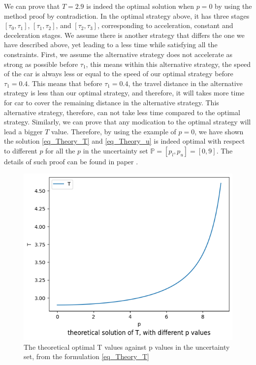 \documentclass  [
  paper    = a4,
  BCOR     = 10mm,
  twoside,
  fontsize = 12pt,
  fleqn,
  toc      = bibnumbered,
  toc      = listofnumbered,
  numbers  = noendperiod,
  headings = normal,
  listof   = leveldown,
  version  = 3.03
]                                       {scrreprt}
\newcommand{\<}{\langle}
\renewcommand{\>}{\rangle}
\begin{document}
We can prove that $T=2.9$ is indeed the optimal solution when $p=0$ by using the method proof by contradiction. In the optimal strategy above, it has three stages $[\tau_0, \tau_1]$, $[\tau_1, \tau_2]$, and $[\tau_2, \tau_3]$, corresponding to acceleration, constant and deceleration stages. We assume there is another strategy that differs the one we have described above, yet leading to a less time while satisfying all the constraints. First, we assume the alternative strategy does not accelerate as strong as possible before $\tau_1$, this means within this alternative strategy, the speed of the car is always less or equal to the speed of our optimal strategy before $\tau_1=0.4$. This means that before $\tau_1=0.4$, the travel distance in the alternative strategy is less than our optimal strategy, and therefore, it will takes more time for car to cover the remaining distance in the alternative strategy. This alternative strategy, therefore, can not take less time compared to the optimal strategy. Similarly, we can prove that any modication to the optimal strategy will lead a bigger $T$ value. Therefore, by using the example of $p=0$, we have shown the solution \ref{eq_Theory_T} and \ref{eq_Theory_u} is indeed optimal with respect to different $p$ for all the $p$ in the uncertainty set $ \mathbb{P}=[p_l, p_u] =[0,9]$. The details of such proof can be found in paper \cite{MatSch22}. 


\begin{figure}[h]
	\centerline{\includegraphics[width=12cm]{theory_T_diff_p.png}}
	\caption{The theoretical optimal T values against p values in the uncertainty set, from the formulation \ref{eq_Theory_T}}
	\label{theory_T_diff_p}
\end{figure}
\end{document}
